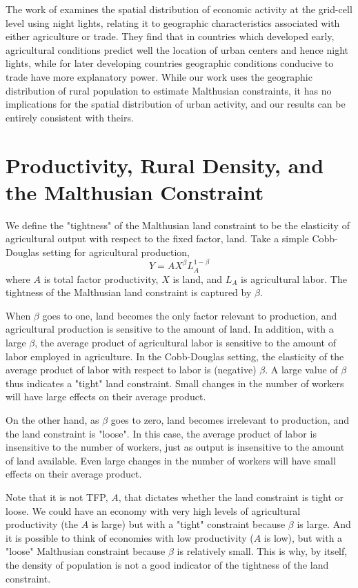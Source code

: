 \documentclass[11pt]{article}
\begin{document}
The work of \citet{hssw2016} examines the spatial distribution of economic activity at the grid-cell level using night lights, relating it to geographic characteristics associated with either agriculture or trade. They find that in countries which developed early, agricultural conditions predict well the location of urban centers and hence night lights, while for later developing countries geographic conditions conducive to trade have more explanatory power. While our work uses the geographic distribution of rural population to estimate Malthusian constraints, it has no implications for the spatial distribution of urban activity, and our results can be entirely consistent with theirs.

\section{Productivity, Rural Density, and the Malthusian Constraint}
We define the "tightness" of the Malthusian land constraint to be the elasticity of agricultural output with respect to the fixed factor, land. Take a simple Cobb-Douglas setting for agricultural production,
\begin{equation}
	Y = A X^{\beta} L_A^{1-\beta}
\end{equation}
where $A$ is total factor productivity, $X$ is land, and $L_A$ is agricultural labor. The tightness of the Malthusian land constraint is captured by $\beta$.

When $\beta$ goes to one, land becomes the only factor relevant to production, and agricultural production is sensitive to the amount of land. In addition, with a large $\beta$, the average product of agricultural labor is sensitive to the amount of labor employed in agriculture. In the Cobb-Douglas setting, the elasticity of the average product of labor with respect to labor is (negative) $\beta$. A large value of $\beta$ thus indicates a "tight" land constraint. Small changes in the number of workers will have large effects on their average product.

On the other hand, as $\beta$ goes to zero, land becomes irrelevant to production, and the land constraint is "loose". In this case, the average product of labor is insensitive to the number of workers, just as output is insensitive to the amount of land available. Even large changes in the number of workers will have small effects on their average product.

Note that it is not TFP, $A$, that dictates whether the land constraint is tight or loose. We could have an economy with very high levels of agricultural productivity (the $A$ is large) but with a "tight" constraint because $\beta$ is large. And it is possible to think of economies with low productivity ($A$ is low), but with a "loose" Malthusian constraint because $\beta$ is relatively small. This is why, by itself, the density of population is not a good indicator of the tightness of the land constraint.
\end{document}
